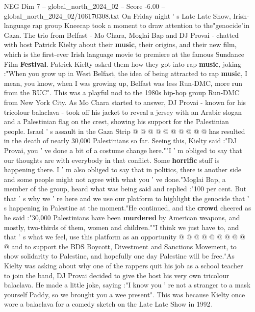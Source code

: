 \begin{textsample}{NEG Dim 7 – global\_north\_2024\_02 – Score -6.00 – global\_north\_2024\_02/106170308.txt}  \label{ex:f7_neg_285}
On Friday night ' s Late Late Show, Irish-language rap group Kneecap took a moment to draw attention to the"genocide"in Gaza.
The trio from Belfast - Mo Chara, Moglai Bap and DJ Provai - chatted with host Patrick Kielty about their \textbf{music}, their origins, and their new film, which is the first-ever Irish language movie to premiere at the famous Sundance Film \textbf{Festival}.
Patrick Kielty asked them how they got into rap \textbf{music}, joking :"When you grow up in West Belfast, the idea of being attracted to rap \textbf{music}, I mean, you know, when I was growing up, Belfast was less Run-DMC, more run from the RUC".
This was a playful nod to the 1980s hip-hop group Run-DMC from New York City.
As Mo Chara started to answer, DJ Provai - known for his tricolour balaclava - took off his jacket to reveal a jersey with an Arabic slogan and a Palestinian flag on the crest, showing his support for the Palestinian people.
Israel ' s assault in the Gaza Strip @ @ @ @ @ @ @ @ @ @ has resulted in the death of nearly 30,000 Palestinians so far.
Seeing this, Kielty said :"DJ Provai, you ' ve done a bit of a costume change here.""I ' m obliged to say that our thoughts are with everybody in that conflict.
Some \textbf{horrific} stuff is happening there.
I ' m also obliged to say that in politics, there is another side and some people might not agree with what you ' ve done."Moglai Bap, a member of the group, heard what was being said and replied :"100 per cent.
But that ' s why we ' re here and we use our platform to highlight the genocide that ' s happening in Palestine at the moment."He continued, and the \textbf{crowd} cheered as he said :"30,000 Palestinians have been \textbf{murdered} by American weapons, and mostly, two-thirds of them, women and children.""I think we just have to, and that ' s what we feel, use this platform as an opportunity @ @ @ @ @ @ @ @ @ @ and to support the BDS Boycott, Divestment and Sanctions Movement, to show solidarity to Palestine, and hopefully one day Palestine will be free."As Kielty was asking about why one of the rappers quit his job as a school teacher to join the band, DJ Provai decided to give the host his very own tricolour balaclava.
He made a little joke, saying :"I know you ' re not a stranger to a mask yourself Paddy, so we brought you a wee present".
This was because Kielty once wore a balaclava for a comedy sketch on the Late Late Show in 1992.

\end{textsample}

